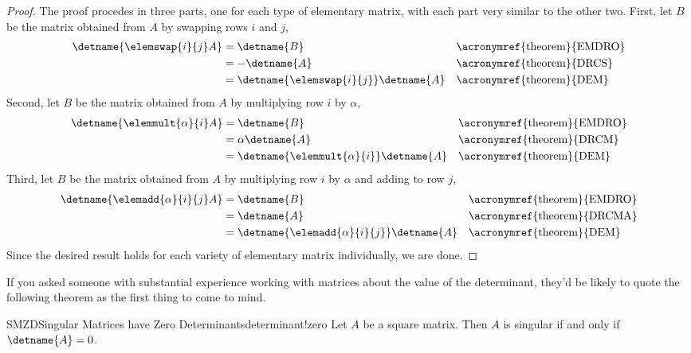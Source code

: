 \begin{proof}
The proof procedes in three parts, one for each type of elementary matrix, with each part very similar to the other two.
First, let $B$ be the matrix obtained from $A$ by swapping rows $i$ and $j$,
%
\begin{align*}
\detname{\elemswap{i}{j}A}
&=\detname{B}&&\text{\acronymref{theorem}{EMDRO}}\\
&=-\detname{A}&&\text{\acronymref{theorem}{DRCS}}\\
&=\detname{\elemswap{i}{j}}\detname{A}&&\text{\acronymref{theorem}{DEM}}
\end{align*}
%
Second, let $B$ be the matrix obtained from $A$ by multiplying row $i$ by $\alpha$,
%
\begin{align*}
\detname{\elemmult{\alpha}{i}A}
&=\detname{B}&&\text{\acronymref{theorem}{EMDRO}}\\
&=\alpha\detname{A}&&\text{\acronymref{theorem}{DRCM}}\\
&=\detname{\elemmult{\alpha}{i}}\detname{A}&&\text{\acronymref{theorem}{DEM}}
\end{align*}
%
Third, let $B$ be the matrix obtained from $A$ by multiplying row $i$ by $\alpha$ and adding to row $j$,
%
\begin{align*}
\detname{\elemadd{\alpha}{i}{j}A}
&=\detname{B}&&\text{\acronymref{theorem}{EMDRO}}\\
&=\detname{A}&&\text{\acronymref{theorem}{DRCMA}}\\
&=\detname{\elemadd{\alpha}{i}{j}}\detname{A}&&\text{\acronymref{theorem}{DEM}}
\end{align*}
%
Since the desired result holds for each variety of elementary matrix individually, we are done.
%
\end{proof}
%
%
If you asked someone with substantial experience working with matrices about the value of the determinant, they'd be likely to quote the following theorem as the first thing to come to mind.
%
\begin{theorem}{SMZD}{Singular Matrices have Zero Determinants}{determinant!zero}
Let $A$ be a square matrix.  Then $A$ is singular if and only if $\detname{A}=0$.
\end{theorem}
%
